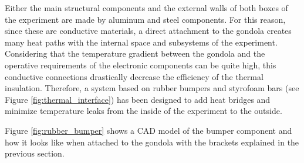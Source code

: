 Either the main structural components and the external walls of both boxes of the experiment are made by aluminum and steel components. For this reason, since these are conductive materials, a direct attachment to the gondola creates many heat paths with the internal space and subsystems of the experiment. Considering that the temperature gradient between the gondola and the operative requirements of the electronic components can be quite high, this conductive connections drastically decrease the efficiency of the thermal insulation. Therefore, a system based on rubber bumpers and styrofoam bars (see Figure \ref{fig:thermal_interface}) has been designed to add heat bridges and minimize temperature leaks from the inside of the experiment to the outside.

Figure \ref{fig:rubber_bumper} shows a CAD model of the bumper component and how it looks like when attached to the gondola with the brackets explained in the previous section.

